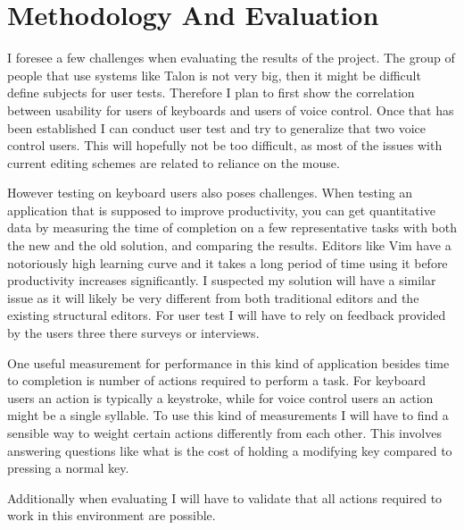 \documentclass[a4paper,english]{ifimaster}
\begin{document}
\section{Methodology And Evaluation}
I foresee a few challenges when evaluating the results of the project.
The group of people that use systems like Talon is not very big, then it might be difficult define subjects
for user tests.
Therefore I plan to first show the correlation between usability for users of keyboards and users of voice control.
Once that has been established I can conduct user test and try to generalize that two voice control users.
This will hopefully not be too difficult, as most of the issues with current editing schemes are related to reliance on the mouse.

However testing on keyboard users also poses challenges.
When testing an application that is supposed to improve productivity, you can get quantitative data
by measuring the time of completion on a few representative tasks with both the new and the old solution, and comparing the results.
Editors like Vim have a notoriously high learning curve and it takes a long period of time using it before productivity increases significantly.
I suspected my solution will have a similar issue as it will likely be very different from both traditional editors
and the existing structural editors.
For user test I will have to rely on feedback provided by the users three there surveys or interviews.

One useful measurement for performance in this kind of application besides time to completion is number of actions required to perform a task.
For keyboard users an action is typically a keystroke, while for voice control users an action might be a single syllable.
To use this kind of measurements I will have to find a sensible way to weight certain actions differently from each other.
This involves answering questions like what is the cost of holding a modifying key compared to pressing a normal key.

Additionally when evaluating I will have to validate that all actions required to work in this environment are possible.






\backmatter{}
\printbibliography{}
\end{document}
